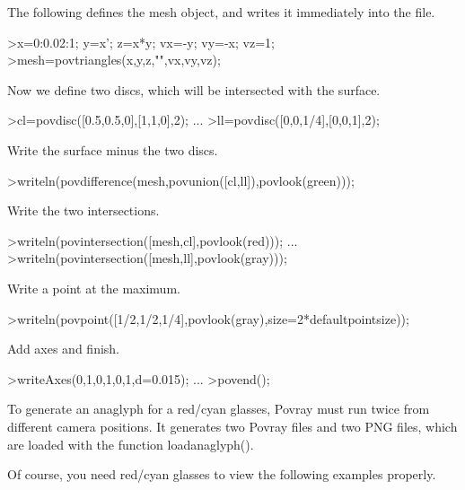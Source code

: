 \documentclass[a4paper,10pt]{article}
\begin{document}
\begin{eulernotebook}
\begin{eulercomment}
The following defines the mesh object, and writes it immediately into the file.
\end{eulercomment}
\begin{eulerprompt}
>x=0:0.02:1; y=x'; z=x*y; vx=-y; vy=-x; vz=1;
>mesh=povtriangles(x,y,z,"",vx,vy,vz);
\end{eulerprompt}
\begin{eulercomment}
Now we define two discs, which will be intersected with the surface.
\end{eulercomment}
\begin{eulerprompt}
>cl=povdisc([0.5,0.5,0],[1,1,0],2); ...
>ll=povdisc([0,0,1/4],[0,0,1],2);
\end{eulerprompt}
\begin{eulercomment}
Write the surface minus the two discs.
\end{eulercomment}
\begin{eulerprompt}
>writeln(povdifference(mesh,povunion([cl,ll]),povlook(green)));
\end{eulerprompt}
\begin{eulercomment}
Write the two intersections.
\end{eulercomment}
\begin{eulerprompt}
>writeln(povintersection([mesh,cl],povlook(red))); ...
>writeln(povintersection([mesh,ll],povlook(gray)));
\end{eulerprompt}
\begin{eulercomment}
Write a point at the maximum.
\end{eulercomment}
\begin{eulerprompt}
>writeln(povpoint([1/2,1/2,1/4],povlook(gray),size=2*defaultpointsize));
\end{eulerprompt}
\begin{eulercomment}
Add axes and finish.
\end{eulercomment}
\begin{eulerprompt}
>writeAxes(0,1,0,1,0,1,d=0.015); ...
>povend();
\end{eulerprompt}
\begin{eulercomment}
To generate an anaglyph for a red/cyan glasses, Povray must run twice
from different camera positions. It generates two Povray files and two
PNG files, which are loaded with the function loadanaglyph().

Of course, you need red/cyan glasses to view the following examples
properly.


\end{eulercomment}
\end{eulernotebook}
\end{document}
